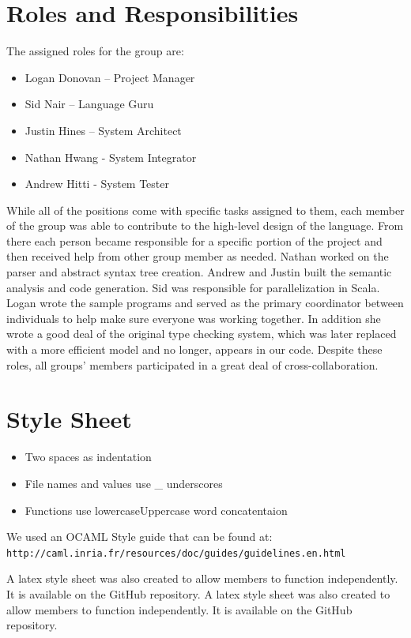 \section{Roles and Responsibilities}
The assigned roles for the group are:
\begin{itemize}
\item Logan Donovan – Project Manager
\item Sid Nair – Language Guru
\item Justin Hines – System Architect
\item Nathan Hwang - System Integrator
\item Andrew Hitti	- System Tester
\end{itemize}

While all of the positions come with specific tasks assigned to them,
each member of the group was able to contribute to the high-level
design of the language.  From there each person became responsible for
a specific portion of the project and then received help from other
group member as needed. Nathan worked on the parser and abstract
syntax tree creation. Andrew and Justin built the semantic analysis
and code generation. Sid was responsible for parallelization in
Scala. Logan wrote the sample programs and served as the primary
coordinator between individuals to help make sure everyone was working
together. In addition she wrote a good deal of the original type
checking system, which was later replaced with a more efficient model
and no longer, appears in our code. Despite these roles, all groups'
members participated in a great deal of cross-collaboration.

\section{Style Sheet}
\begin{itemize}
\item Two spaces as indentation 
\item File names and values use \_ underscores
\item Functions use lowercaseUppercase word concatentaion 
\end{itemize}

We used an OCAML Style guide that can be found at:
\\ \verb=http://caml.inria.fr/resources/doc/guides/guidelines.en.html=

A latex style sheet was also created to allow members to function
independently. It is available on the GitHub repository.
\newline
A latex style sheet was also created to allow members to function independently. It is available on the GitHub repository.
